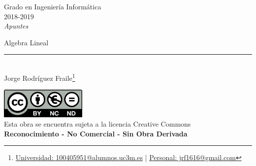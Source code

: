 \documentclass[12pt]{report} %
\begin{document}
	
\begin{titlepage}
	\begin{sffamily}
	\color{azulUC3M}
	\begin{center}
		\begin{figure}[H] %
		\end{figure}
		\vspace{2.5cm}
		\begin{Large}
			Grado en Ingeniería Informática\\			
			2018-2019\\
			\vspace{2cm}		
			\textsl{Apuntes}\\
			\bigskip
		\end{Large}
		 	{\Huge Algebra Lineal}\\
		 	\vspace*{0.5cm}
	 		\rule{10.5cm}{0.1mm}\\
			\vspace*{0.9cm}
			{\LARGE Jorge Rodríguez Fraile\footnote{\href{mailto:100405951@alumnos.uc3m.es}{Universidad: 100405951@alumnos.uc3m.es}  |  \href{mailto:jrf1616@gmail.com}{Personal: jrf1616@gmail.com}}}\\ 
			\vspace*{1cm}
	\end{center}
	\vfill
	\color{black}
		\includegraphics[width=4.2cm]{img/creativecommons.png}\\
		Esta obra se encuentra sujeta a la licencia Creative Commons\\ \textbf{Reconocimiento - No Comercial - Sin Obra Derivada}
	\end{sffamily}
\end{titlepage}


\tableofcontents
\thispagestyle{fancy}
\end{document}
